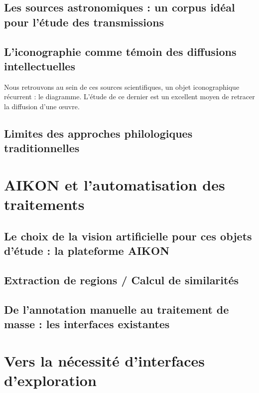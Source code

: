 \documentclass[a4paper,12pt,twoside]{book}
\newcommand{\clearemptydoublepage}{\newpage{\pagestyle{empty}\cleardoublepage}}
\begin{document}
	\section[Un corpus idéal pour l'étude des transmissions]{Les sources astronomiques : un corpus idéal pour l'étude des transmissions}
	

	\section[L'iconographie témoin des diffusions intellectuelles]{L'iconographie comme témoin des diffusions intellectuelles}

	Nous retrouvons au sein de ces sources scientifiques, un objet iconographique récurrent : le diagramme. L'étude de ce dernier est un excellent moyen de retracer la diffusion d'une œuvre.
	

	\section{Limites des approches philologiques traditionnelles}
	

	\clearemptydoublepage

	\chapter{AIKON et l'automatisation des traitements}
	\section{Le choix de la vision artificielle pour ces objets d'étude : la plateforme AIKON}
	

	\section{Extraction de regions / Calcul de similarités}
	

	\section{De l'annotation manuelle au traitement de masse : les interfaces existantes}
	

	\clearemptydoublepage

	\chapter{Vers la nécessité d'interfaces d'exploration}
\end{document}
